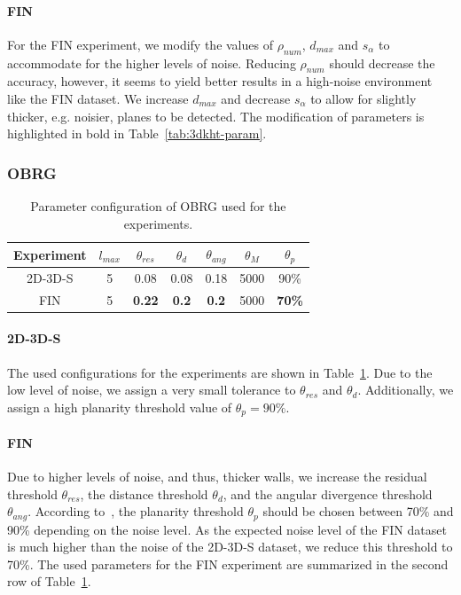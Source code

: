 \documentclass[main.tex]{subfiles}
\begin{document}
\paragraph{FIN}
For the FIN experiment, we modify the values of $\rho_{num}$, $d_{max}$ and $s_\alpha$ to accommodate for the higher levels of noise.
Reducing $\rho_{num}$ should decrease the accuracy, however, it seems to yield better results in a high-noise environment like the FIN dataset.
We increase $d_{max}$ and decrease $s_\alpha$ to allow for slightly thicker, e.g. noisier, planes to be detected.
The modification of parameters is highlighted in bold in Table~\ref{tab:3dkht-param}.

\subsubsection{OBRG}
\begin{table}[H]
    \centering
    \begin{tabular}{c|cccccc}
        Experiment & $l_{max}$ & $\theta_{res}$ & $\theta_{d}$ & $\theta_{ang}$ & $\theta_M$ & $\theta_p$    \\ \hline
        2D-3D-S    & 5         & 0.08           & 0.08         & 0.18           & 5000       & 90\%          \\
        FIN        & 5         & \textbf{0.22}  & \textbf{0.2} & \textbf{0.2}   & 5000       & \textbf{70\%}
    \end{tabular}
    \caption{Parameter configuration of OBRG used for the experiments.}
    \label{tab:obrg-param}
\end{table}


\paragraph{2D-3D-S}
The used configurations for the experiments are shown in Table~\ref{tab:obrg-param}.
Due to the low level of noise, we assign a very small tolerance to $\theta_{res}$ and $\theta_d$. Additionally, we assign a high
planarity threshold value of $\theta_p = 90\%$.

\paragraph{FIN}
Due to higher levels of noise, and thus, thicker walls, we increase the residual threshold $\theta_{res}$, the distance
threshold $\theta_d$, and the angular divergence threshold $\theta_{ang}$. According to~\cite[Section~3.4]{Vo_Truong-Hong_Laefer_Bertolotto_2015},
the planarity threshold $\theta_p$ should be chosen between 70\% and 90\% depending on the noise level. As the expected noise level of the
FIN dataset is much higher than the noise of the 2D-3D-S dataset, we reduce this threshold to 70\%.
The used parameters for the FIN experiment are summarized in the second row of Table~\ref{tab:obrg-param}.
\end{document}
